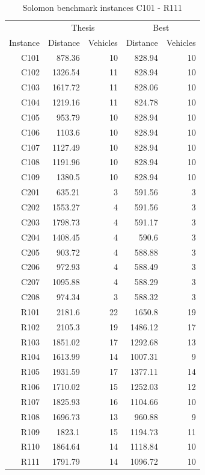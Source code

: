 \documentclass[a4paper,twoside,12pt]{book}
\begin{document}
\begin{table}
\centering
\caption{Solomon benchmark instances C101 - R111}
\label{tab:solomonPart1}
\begin{tabular}{rrrrr}
\toprule
	         &\multicolumn{2}{c}{Thesis} & \multicolumn{2}{c}{Best} \\
	         \cmidrule(r){2-3}\cmidrule(r){4-5}
	Instance &     Distance &  Vehicles & Distance & Vehicles \\
\midrule
 C101 & 878.36 & 10 & 828.94 & 10 \\ 
 C102 & 1326.54 & 11 & 828.94 & 10 \\ 
 C103 & 1617.72 & 11 & 828.06 & 10 \\ 
 C104 & 1219.16 & 11 & 824.78 & 10 \\ 
 C105 & 953.79 & 10 & 828.94 & 10 \\ 
 C106 & 1103.6 & 10 & 828.94 & 10 \\ 
 C107 & 1127.49 & 10 & 828.94 & 10 \\ 
 C108 & 1191.96 & 10 & 828.94 & 10 \\ 
 C109 & 1380.5 & 10 & 828.94 & 10 \\ 
 C201 & 635.21 & 3 & 591.56 & 3 \\ 
 C202 & 1553.27 & 4 & 591.56 & 3 \\ 
 C203 & 1798.73 & 4 & 591.17 & 3 \\ 
 C204 & 1408.45 & 4 & 590.6 & 3 \\ 
 C205 & 903.72 & 4 & 588.88 & 3 \\ 
 C206 & 972.93 & 4 & 588.49 & 3 \\ 
 C207 & 1095.88 & 4 & 588.29 & 3 \\ 
 C208 & 974.34 & 3 & 588.32 & 3 \\ 
 R101 & 2181.6 & 22 & 1650.8 & 19 \\ 
 R102 & 2105.3 & 19 & 1486.12 & 17 \\ 
 R103 & 1851.02 & 17 & 1292.68 & 13 \\ 
 R104 & 1613.99 & 14 & 1007.31 & 9 \\ 
 R105 & 1931.59 & 17 & 1377.11 & 14 \\ 
 R106 & 1710.02 & 15 & 1252.03 & 12 \\ 
 R107 & 1825.93 & 16 & 1104.66 & 10 \\ 
 R108 & 1696.73 & 13 & 960.88 & 9 \\ 
 R109 & 1823.1 & 15 & 1194.73 & 11 \\ 
 R110 & 1864.64 & 14 & 1118.84 & 10 \\ 
 R111 & 1791.79 & 14 & 1096.72 & 10 \\ 

\bottomrule
\end{tabular}
\end{table}  
\end{document}
